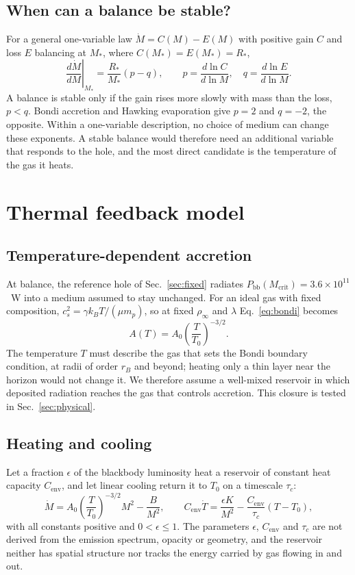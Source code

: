 \documentclass[11pt,a4paper]{article}
\newcommand{\Pbb}{P_{\mathrm{bb}}}
\newcommand{\Mcrit}{M_{\mathrm{crit}}}
\newcommand{\Cenv}{C_{\mathrm{env}}}
\begin{document}
\subsection{When can a balance be stable?}
For a general one-variable law $\dot M=C(M)-E(M)$ with positive gain $C$ and loss $E$ balancing at $M_*$, where $C(M_*)=E(M_*)=R_*$,
\begin{equation*}
 \left.\frac{d\dot M}{dM}\right|_{M_*}=\frac{R_*}{M_*}(p-q),\qquad
 p=\frac{d\ln C}{d\ln M},\quad q=\frac{d\ln E}{d\ln M}.
\end{equation*}
A balance is stable only if the gain rises more slowly with mass than the loss, $p<q$. Bondi accretion and Hawking evaporation give $p=2$ and $q=-2$, the opposite. Within a one-variable description, no choice of medium can change these exponents. A stable balance would therefore need an additional variable that responds to the hole, and the most direct candidate is the temperature of the gas it heats.

\section{Thermal feedback model}\label{sec:model}
\subsection{Temperature-dependent accretion}
At balance, the reference hole of Sec.~\ref{sec:fixed} radiates $\Pbb(\Mcrit)=3.6\times10^{11}$~W into a medium assumed to stay unchanged. For an ideal gas with fixed composition, $c_s^2=\gamma k_BT/(\mu m_p)$, so at fixed $\rho_\infty$ and $\lambda$ Eq.~\eqref{eq:bondi} becomes
\begin{equation}
 A(T)=A_0\left(\frac{T}{T_0}\right)^{-3/2}.
 \label{eq:AT}
\end{equation}
The temperature $T$ must describe the gas that sets the Bondi boundary condition, at radii of order $r_B$ and beyond; heating only a thin layer near the horizon would not change it. We therefore assume a well-mixed reservoir in which deposited radiation reaches the gas that controls accretion. This closure is tested in Sec.~\ref{sec:physical}.

\subsection{Heating and cooling}
Let a fraction $\epsilon$ of the blackbody luminosity heat a reservoir of constant heat capacity $\Cenv$, and let linear cooling return it to $T_0$ on a timescale $\tau_c$:
\begin{equation}
 \dot M=A_0\left(\frac{T}{T_0}\right)^{-3/2}M^2-\frac{B}{M^2},\qquad
 \Cenv\dot T=\frac{\epsilon K}{M^2}-\frac{\Cenv}{\tau_c}(T-T_0),
 \label{eq:dimensional}
\end{equation}
with all constants positive and $0<\epsilon\le1$. The parameters $\epsilon$, $\Cenv$ and $\tau_c$ are not derived from the emission spectrum, opacity or geometry, and the reservoir neither has spatial structure nor tracks the energy carried by gas flowing in and out.
\end{document}
